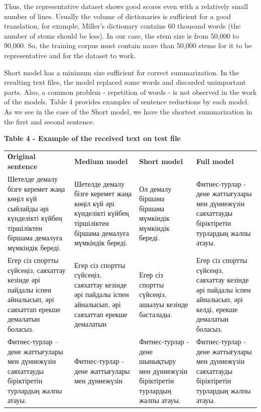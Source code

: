 Thus, the representative dataset shows good scores even with a
relatively small number of lines. Usually the volume of dictionaries is
sufficient for a good translation, for example, Miller's dictionary
contains 60 thousand words (the number of stems should be less). In our
case, the stem size is from 50,000 to 90,000. So, the training corpus
must contain more than 50,000 stems for it to be representative and for
the dataset to work.

Short model has a minimum size sufficient for correct summarization. In
the resulting text files, the model replaced some words and discarded
unimportant parts. Also, a common problem - repetition of words - is not
observed in the work of the models. Table 4 provides examples of
sentence reductions by each model. As we see in the case of the Short
model, we have the shortest summarization in the first and second
sentence.

\textbf{Table 4 - Example of the received text on test file}

\begin{longtable}[]{@{}
  >{\raggedright\arraybackslash}p{}
  >{\raggedright\arraybackslash}p{}
  >{\raggedright\arraybackslash}p{}
  >{\raggedright\arraybackslash}p{}@{}}
\toprule\noalign{}
\endhead
\bottomrule\noalign{}
\endlastfoot
\textbf{Оriginal sentence} & \textbf{Medium model} & \textbf{Short
model} & \textbf{Full model} \\
Шетелде демалу бізге керемет жаңа көңіл күй сыйлайды әрі күнделікті
күйбең тіршіліктен біршама демалуға мүмкіндік береді. & Шетелде демалу
бізге керемет жаңа көңіл күй әрі күнделікті күйбең тіршіліктен біршама
демалуға мүмкіндік береді. & Ол демалу біршама біршама мүмкіндік
мүмкіндік береді. & Фитнес-турлар - дене жаттығулары мен дүниежүзін
саяхаттауды біріктіретін турлардың жалпы атауы. \\
Егер сіз спортты сүйсеңіз, саяхаттау кезінде әрі пайдалы іспен
айналысып, әрі саяхаттап ерекше демалатын боласыз. & Егер сіз спортты
сүйсеңіз, саяхаттау кезінде әрі пайдалы іспен айналысып, әрі саяхаттап
ерекше демалатын & Егер сіз спортты сүйсеңіз, ашылуы кезінде басталады.
& Егер сіз спортты сүйсеңіз, саяхаттау кезінде әрі пайдалы іспен
айналысып, әрі келді, ерекше демалатын боласыз. \\
Фитнес-турлар -- дене жаттығулары мен дүниежүзін саяхаттауды
біріктіретін турлардың жалпы атауы. & Фитнес-турлар - дене жаттығулары
мен дүниежүзін & Фитнес-турлар - дене шынықтыру мен дүниежүзін
біріктіретін турлардың жалпы атауы. & Фитнес-турлар - дене жаттығулары
мен дүниежүзін саяхаттауды біріктіретін турлардың жалпы атауы. \\
\end{longtable}

